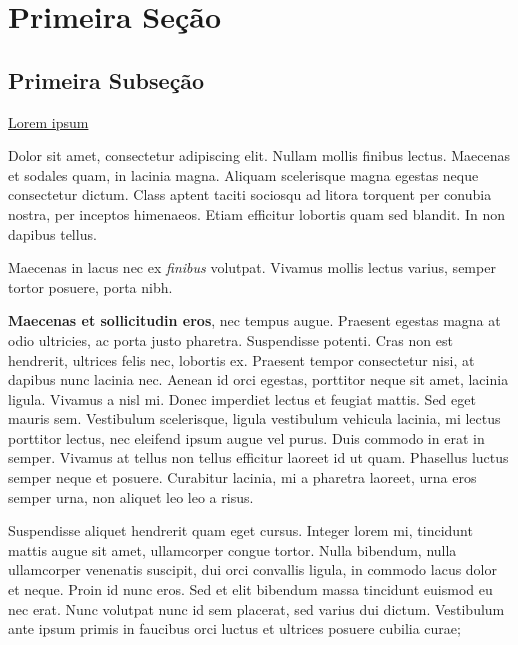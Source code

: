 \documentclass[a4paper,12pt]{article}
\begin{document}
\section{Primeira Seção}

\subsection{Primeira Subseção}

\begin{flushright}
\underline{Lorem ipsum} 
\end{flushright}

Dolor sit amet, consectetur adipiscing elit. Nullam mollis finibus lectus. Maecenas et sodales quam, in lacinia magna. Aliquam scelerisque magna egestas neque consectetur dictum. Class aptent taciti sociosqu ad litora torquent per conubia nostra, per inceptos himenaeos. Etiam efficitur lobortis quam sed blandit. In non dapibus tellus. 


\begin{center}
Maecenas in lacus nec ex \emph{finibus} volutpat. Vivamus mollis lectus varius, semper tortor posuere, porta nibh.
\end{center}

\textbf{Maecenas et sollicitudin eros}, nec tempus augue. Praesent egestas magna at odio ultricies, ac porta justo pharetra. Suspendisse potenti. Cras non est hendrerit, ultrices felis nec, lobortis ex. Praesent tempor consectetur nisi, at dapibus nunc lacinia nec. Aenean id orci egestas, porttitor neque sit amet, lacinia ligula. Vivamus a nisl mi. Donec imperdiet lectus et feugiat mattis. Sed eget mauris sem. Vestibulum scelerisque, ligula vestibulum vehicula lacinia, mi lectus porttitor lectus, nec eleifend ipsum augue vel purus. Duis commodo in erat in semper. Vivamus at tellus non tellus efficitur laoreet id ut quam. Phasellus luctus semper neque et posuere. Curabitur lacinia, mi a pharetra laoreet, urna eros semper urna, non aliquet leo leo a risus.\vspace{2cm}

Suspendisse aliquet hendrerit quam eget cursus. Integer lorem mi, tincidunt mattis augue sit amet, ullamcorper congue tortor. Nulla bibendum, nulla ullamcorper venenatis suscipit, dui orci convallis ligula, in commodo lacus dolor et neque. Proin id nunc eros. Sed et elit bibendum massa tincidunt euismod eu nec erat. Nunc volutpat nunc id sem placerat, sed varius dui dictum. Vestibulum ante ipsum primis in faucibus orci luctus et ultrices posuere cubilia curae;
\end{document}
